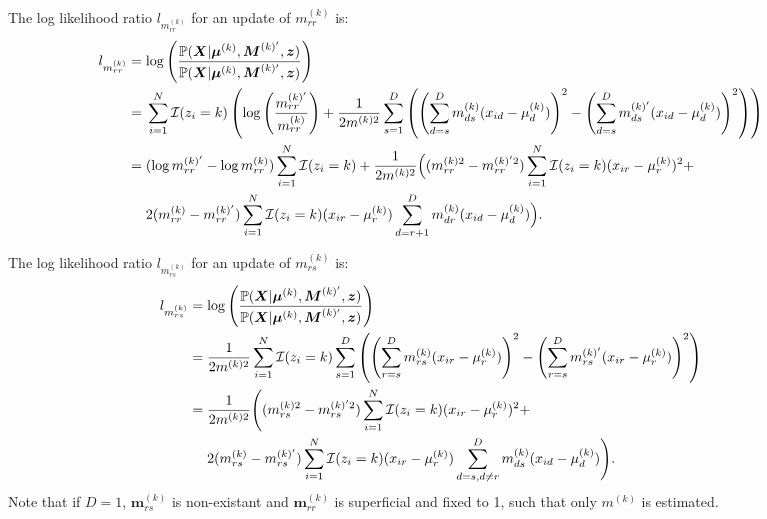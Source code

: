 \documentclass[a4paper,11pt]{article}
\def\M{\boldsymbol{M}}
\def\X{\boldsymbol{X}}
\def\bmrr{\boldsymbol m_{rr}}
\def\bmrs{\boldsymbol m_{rs}}
\def\bmu{\boldsymbol{\mu}}
\def\p{\mathbb{P}}
\def\mrr{m_{rr}}
\def\mrs{m_{rs}}
\begin{document}
The log likelihood ratio $l_{\mrr^{(k)}}$ for an update of $\mrr^{(k)}$ is:
\begin{align*}
l_{\mrr^{(k)}} &= \log \left( \frac{\p(\X | \bmu^{(k)}, \M^{(k)'}, \boldsymbol z )}{\p(\X | \bmu^{(k)}, \M^{(k)'}, \boldsymbol z )} \right) \\
&= \begin{aligned}[t]
    & \sum_{i=1}^N {\cal I}(z_i = k) \left( \log \left(\frac{\mrr^{(k)'}}{\mrr^{(k)}}\right)  + \frac{1}{2m^{(k)2}} \sum_{s = 1}^{D}\left( \left(\sum_{d = s}^{D}m_{ds}^{(k)} (x_{id} - \mu_d^{(k)}) \right)^2- \left(\sum_{d = s}^{D}m_{ds}^{(k)'} (x_{id} - \mu_d^{(k)}) \right)^2 \right) \right)
\end{aligned}\\
 &= \begin{aligned}[t]
 & (\log \mrr^{(k)'} - \log \mrr^{(k)}) \sum_{i=1}^N {\cal I}(z_i = k) + \frac{1}{2m^{(k)2}}\Big((\mrr^{(k)2} - \mrr^{(k)'2}) \sum_{i=1}^N {\cal I}(z_i = k) (x_{ir} - \mu_r^{(k)})^2 +\\
 & 2(\mrr^{(k)} - \mrr^{(k)'})\sum_{i=1}^N{\cal I}(z_i = k) (x_{ir} - \mu_r^{(k)}) \sum_{d=r+1}^D m_{dr}^{(k)}(x_{id} - \mu_d^{(k)})\Big).
 \end{aligned}
\end{align*}

The log likelihood ratio $l_{\mrs^{(k)}}$ for an update of $\mrs^{(k)}$ is:
\begin{align*}
l_{\mrs^{(k)}} &= \log \left( \frac{\p(\X | \bmu^{(k)}, \M^{(k)'}, \boldsymbol z )}{\p(\X | \bmu^{(k)}, \M^{(k)'}, \boldsymbol z )} \right) \\
 &= \begin{aligned}[t]
& \frac{1}{2m^{(k)2}}\sum_{i=1}^N {\cal I}(z_i = k) \sum_{s = 1}^{D}\left( \left(\sum_{r = s}^{D}m_{rs}^{(k)} (x_{ir} - \mu_r^{(k)}) \right)^2- \left(\sum_{r = s}^{D}m_{rs}^{(k)'} (x_{ir} - \mu_r^{(k)}) \right)^2 \right)
 \end{aligned}\\
 &= \begin{aligned}[t]
 & \frac{1}{2m^{(k)2}} \Bigg( (\mrs^{(k)2} - \mrs^{(k)'2} ) \sum_{i=1}^N{\cal I}(z_i = k)(x_{ir} - \mu_r^{(k)})^2 + \\
 & 2(\mrs^{(k)} - \mrs^{(k)'}) \sum_{i=1}^N {\cal I}(z_i = k)(x_{ir} - \mu_r^{(k)}) \sum_{d=s, d\neq r}^D m_{ds}^{(k)}(x_{id} - \mu_d^{(k)}) \Bigg).
 \end{aligned}
\end{align*}
Note that if $D=1$, $\bmrs^{(k)}$ is non-existant and $\bmrr^{(k)}$ is superficial and fixed to 1, such that only $m^{(k)}$ is estimated.
\end{document}
